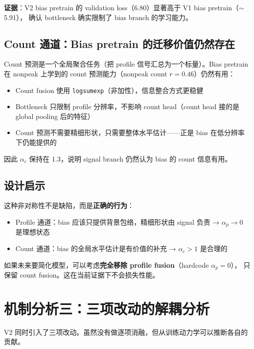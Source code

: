 \documentclass[11pt,a4paper]{ctexart}
\begin{document}
\textbf{证据}：V2 bias pretrain 的 validation loss（6.80）显著高于 V1 bias pretrain（$\sim$5.91），
确认 bottleneck 确实限制了 bias branch 的学习能力。

\subsection{Count 通道：Bias pretrain 的迁移价值仍然存在}

Count 预测是一个全局聚合任务（把 profile 信号汇总为一个标量）。Bias pretrain 在 nonpeak 上学到的
count 预测能力（nonpeak count $r = 0.46$）仍然有用：
\begin{itemize}[leftmargin=2em]
  \item Count fusion 使用 \texttt{logsumexp}（非加性），信息整合方式更稳健
  \item Bottleneck 只限制 profile 分辨率，不影响 count head（count head 接的是 global pooling 后的特征）
  \item Count 预测不需要精细形状，只需要整体水平估计——正是 bias 在低分辨率下仍能提供的
\end{itemize}

因此 $\alpha_c$ 保持在 1.3，说明 signal branch 仍然认为 bias 的 count 信息有用。

\subsection{设计启示}

这种非对称性不是缺陷，而是\textbf{正确的行为}：
\begin{itemize}[leftmargin=2em]
  \item Profile 通道：bias 应该只提供背景包络，精细形状由 signal 负责 → $\alpha_p \to 0$ 是理想状态
  \item Count 通道：bias 的全局水平估计是有价值的补充 → $\alpha_c > 1$ 是合理的
\end{itemize}

如果未来要简化模型，可以考虑\textbf{完全移除 profile fusion}（hardcode $\alpha_p = 0$），
只保留 count fusion。这在当前证据下不会损失性能。

\section{机制分析三：三项改动的解耦分析}

V2 同时引入了三项改动。虽然没有做逐项消融，但从训练动力学可以推断各自的贡献。
\end{document}
